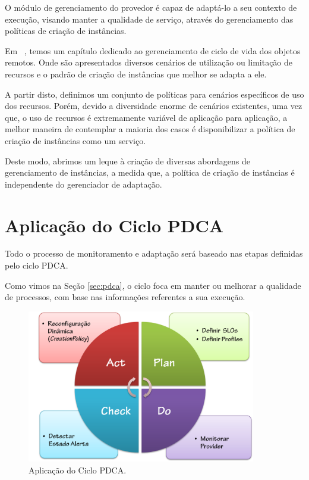 O módulo de gerenciamento do provedor é capaz de adaptá-lo a seu contexto de execução, visando manter a qualidade de serviço, através do gerenciamento das políticas de criação de instâncias.

Em ~\cite{volter2005remoting}, temos um capítulo dedicado ao gerenciamento de ciclo de vida dos objetos remotos. Onde são apresentados diversos cenários de utilização ou limitação de recursos e o padrão de criação de instâncias que melhor se adapta a ele.

A partir disto, definimos um conjunto de políticas para cenários específicos de uso dos recursos. Porém, devido a diversidade enorme de cenários existentes, uma vez que, o uso de recursos é extremamente variável de aplicação para aplicação, a melhor maneira de contemplar a maioria dos casos é disponibilizar a política de criação de instâncias como um serviço. 

Deste modo, abrimos um leque à criação de diversas abordagens de gerenciamento de instâncias, a medida que, a política de criação de instâncias é independente do gerenciador de adaptação.


\section{Aplicação do Ciclo PDCA}
Todo o processo de monitoramento e adaptação será baseado nas etapas definidas pelo ciclo PDCA.

Como vimos na Seção \ref{sec:pdca}, o ciclo foca em manter ou melhorar a qualidade de processos, com base nas informações referentes a sua execução.

\begin{figure}[htp]
\centering
\includegraphics[width=10cm]{chapters/chapter4/pdca_actions.png}
\caption[Aplicação do Ciclo PDCA]{Aplicação do Ciclo PDCA.}
\label{fig:pdcamapping}
\end{figure}

